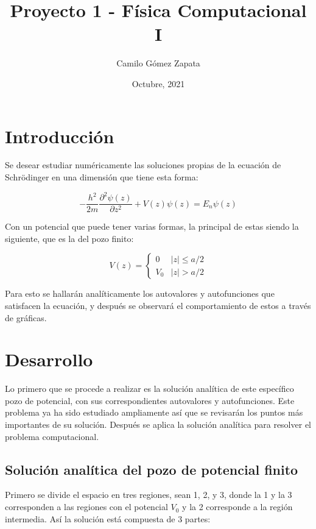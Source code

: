\documentclass{article}
\title{Proyecto 1 - Física Computacional I}
\author{Camilo Gómez Zapata}
\date{Octubre, 2021}
\begin{document}
\maketitle

\section{Introducción}

Se desear estudiar numéricamente las soluciones propias de la ecuación de Schrödinger en una dimensión que tiene esta forma:

\begin{equation}
    -\frac{h^2}{2m}\frac{\partial^2\psi(z)}{\partial z^2}+V(z)\psi(z)=E_n\psi(z)    
\end{equation}

Con un potencial que puede tener varias formas, la principal de estas siendo la siguiente, que es la del pozo finito:

\begin{equation}
    V(z)= 
    \begin{cases}
       0 &|z|\leq a/2 \\
       V_0 &|z|> a/2
    \end{cases}
\end{equation}

Para esto se hallarán analíticamente los autovalores y autofunciones que satisfacen la ecuación, y después se observará el comportamiento de estos a través de gráficas.

\section{Desarrollo}

Lo primero que se procede a realizar es la solución analítica de este específico pozo de potencial, con sus correspondientes autovalores y autofunciones. Este problema ya ha sido estudiado ampliamente así que se revisarán los puntos más importantes de su solución. Después se aplica la solución analítica para resolver el problema computacional.

\subsection{Solución analítica del pozo de potencial finito}

Primero se divide el espacio en tres regiones, sean 1, 2, y 3, donde la 1 y la 3 corresponden a las regiones con el potencial $V_0$ y la 2 corresponde a la región intermedia. Así la solución está compuesta de 3 partes:
\end{document}
